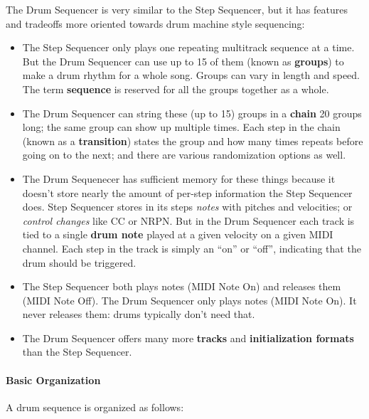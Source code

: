 \documentclass{article}
\begin{document}
The Drum Sequencer is very similar to the Step Sequencer, but it has features and tradeoffs more oriented towards drum machine style sequencing:

\begin{itemize}
\item The Step Sequencer only plays one repeating multitrack sequence at a time.   But the Drum Sequencer can use up to 15 of them (known as {\bf groups}) to make a drum rhythm for a whole song.  Groups can vary in length and speed.  The term {\bf sequence} is reserved for all the groups together as a whole.
\end{itemize}

\begin{itemize}
\item The Drum Sequencer can string these (up to 15) groups in a {\bf chain} 20 groups long; the same group can show up multiple times.  Each step in the chain (known as a {\bf transition}) states the group and how many times repeats before going on to the next; and there are various randomization options as well.
\item The Drum Sequenecer has sufficient memory for these things because it doesn't store nearly the amount of per-step information the Step Sequencer does. Step Sequencer stores in its steps {\it notes} with pitches and velocities; or {\it control changes} like CC or NRPN.  But in the Drum Sequencer each track is tied to a single {\bf drum note} played at a given velocity on a given MIDI channel.  Each step in the track is simply an ``on'' or ``off'', indicating that the drum should be triggered.
\item The Step Sequencer both plays notes (MIDI Note On) and releases them (MIDI Note Off).  The Drum Sequencer only plays notes (MIDI Note On).  It never releases them: drums typically don't need that.
\item The Drum Sequencer offers many more {\bf tracks} and {\bf initialization formats} than the Step Sequencer.
\end{itemize}

\paragraph{Basic Organization} A drum sequence is organized as follows:
\end{document}
